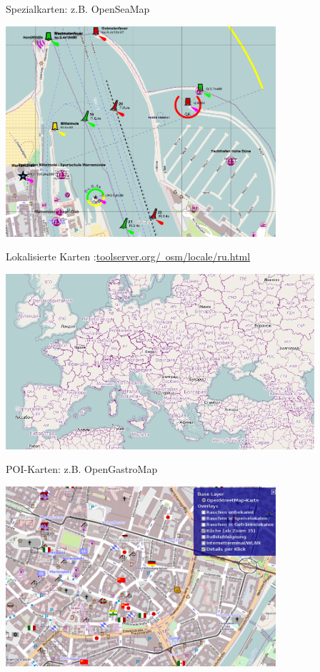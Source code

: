 \documentclass{beamer}
\begin{document}
\begin{frame}{Spezialkarten: z.B. OpenSeaMap}

 \includegraphics[width=10cm]{style-seamap.png}

\end{frame}

\hypersetup{urlcolor=cyan}
\begin{frame}{Lokalisierte Karten :\hfill\href{http://toolserver.org/~osm/locale/ru.html}{toolserver.org/~osm/locale/ru.html}}
	\begin{center}
		\vspace{-1cm}
		\includegraphics[height=6.5cm]{style-russ.png}
	\end{center}
\end{frame}
\hypersetup{urlcolor=blue}



\begin{frame}{POI-Karten: z.B. OpenGastroMap}

 \includegraphics[width=10cm]{opengastromap-de.png}

\end{frame}
\end{document}
